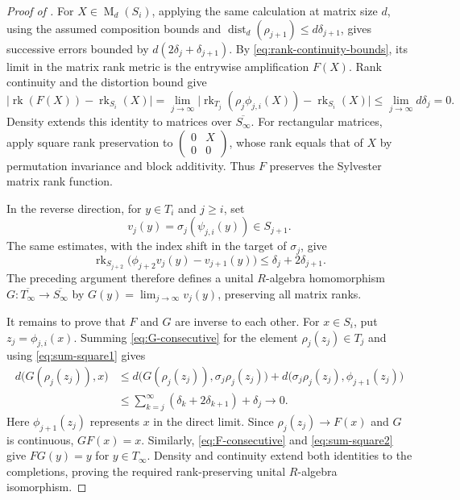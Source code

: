 \documentclass[11pt]{amsart}
\DeclareMathOperator{\rk}{rk}
\DeclareMathOperator{\Mat}{M}
\theoremstyle{definition}
\theoremstyle{remark}
\begin{document}
\begin{proof}[Proof of ]
For $X\in\Mat_d(S_i)$, applying the same calculation at matrix
size $d$, using the assumed composition bounds and
$\operatorname{dist}_d(\rho_{j+1})\leq d\delta_{j+1}$,
gives successive errors bounded by $d(2\delta_j+\delta_{j+1})$.
By \eqref{eq:rank-continuity-bounds}, its limit in the matrix rank metric
is the entrywise amplification $F(X)$.
Rank continuity and the distortion bound give
\[
 \bigl|\rk(F(X))-\rk_{S_i}(X)\bigr|
 =\lim_{j\to\infty}
 \bigl|\rk_{T_j}(\rho_j\phi_{j,i}(X))-\rk_{S_i}(X)\bigr|
 \leq\lim_{j\to\infty}d\delta_j=0.
\]
Density extends this identity to matrices over $\overline{S_\infty}$.
For rectangular matrices, apply square rank preservation to
$\begin{pmatrix}0&X\\0&0\end{pmatrix}$, whose rank equals that of $X$
by permutation invariance and block additivity.
Thus $F$ preserves the Sylvester matrix rank function.

In the reverse direction, for $y\in T_i$ and $j\geq i$, set
\[
 v_j(y)=\sigma_j(\psi_{j,i}(y))\in S_{j+1}.
\]
The same estimates, with the index shift in the target of $\sigma_j$, give
\begin{equation}\label{eq:G-consecutive}
 \rk_{S_{j+2}}\bigl(\phi_{j+2}v_j(y)-v_{j+1}(y)\bigr)
 \leq\delta_j+2\delta_{j+1}.
\end{equation}
The preceding argument therefore defines a unital $R$-algebra homomorphism
$G\colon\overline{T_\infty}\to\overline{S_\infty}$ by
$G(y)=\lim_{j\to\infty}v_j(y)$, preserving all matrix ranks.

It remains to prove that $F$ and $G$ are inverse to each other.
For $x\in S_i$, put $z_j=\phi_{j,i}(x)$.
Summing \eqref{eq:G-consecutive} for the element $\rho_j(z_j)\in T_j$
and using \eqref{eq:sum-square1} gives
\[
 \begin{aligned}
 d\bigl(G(\rho_j(z_j)),x\bigr)
 &\leq d\bigl(G(\rho_j(z_j)),\sigma_j\rho_j(z_j)\bigr)
       +d\bigl(\sigma_j\rho_j(z_j),\phi_{j+1}(z_j)\bigr)\\
 &\leq\sum_{k=j}^{\infty}(\delta_k+2\delta_{k+1})+\delta_j
 \longrightarrow0.
 \end{aligned}
\]
Here $\phi_{j+1}(z_j)$ represents $x$ in the direct limit.
Since $\rho_j(z_j)\to F(x)$ and $G$ is continuous, $GF(x)=x$.
Similarly, \eqref{eq:F-consecutive} and \eqref{eq:sum-square2}
give $FG(y)=y$ for $y\in T_\infty$.
Density and continuity extend both identities to the completions,
proving the required rank-preserving unital $R$-algebra isomorphism.
\end{proof}
\end{document}
